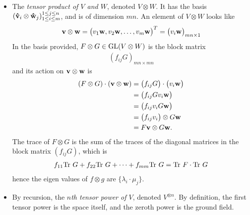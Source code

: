 \begin{itemize}
			\item The \emph{tensor product of $V$ and $W$}, denoted $V \otimes W$.
				\subitem It has the basis $(\mathbf{\hat{v}}_i \otimes \mathbf{\hat{w}}_j)_{1 \leq i \leq m}^{1 \leq j \leq n}$, and is of dimension $mn$.
				\subitem An element of $V \otimes W$ looks like \begin{align*}
					\mathbf{v} \otimes \mathbf{w} = \begin{pmatrix}
						v_1\mathbf{w}, v_2\mathbf{w}, \dots, v_m\mathbf{w}
					\end{pmatrix}^T = \begin{pmatrix}
						v_i\mathbf{w}
					\end{pmatrix}_{mn \times 1} 
				\end{align*}
				\subitem In the basis provided, $F \otimes G \in \text{GL}(V \otimes W)$ is the block matrix 
				\begin{align*}
					(f_{ij}G)_{mn \times mn}
				\end{align*}
				and its action on $\mathbf{v} \otimes \mathbf{w}$ is 
				\begin{align*}
					(F \otimes G ) \cdot (\mathbf{v}  \otimes \mathbf{w}) &= \begin{pmatrix}
						f_{ij}G
					\end{pmatrix}\cdot \begin{pmatrix}
						v_i\mathbf{w}
					\end{pmatrix} \\ 
					&= \begin{pmatrix}
						f_{ij}G v_i \mathbf{w}
					\end{pmatrix} \\ 
					&= \begin{pmatrix}
						f_{ij} v_i G\mathbf{w}
					\end{pmatrix} \\
					&=  \begin{pmatrix}
						f_{ij}v_i
					\end{pmatrix} \otimes G\mathbf{w} \\
					&= F\mathbf{v} \otimes G\mathbf{w}.
				\end{align*}
				\subitem The trace of $F \otimes G$ is the sum of the traces of the diagonal matrices in the block matrix $(f_{ij}G)$, which is 
				\begin{align*}
					f_{11} \text{Tr } G + f_{22} \text{Tr } G + \dots + f_{mm} \text{Tr } G = \text{Tr } F \cdot \text{Tr } G
				\end{align*}
				hence the eigen values of $f \otimes g$ are $\{\lambda_i \cdot \mu_j\}$.
				
			\item By recursion, the \emph{$n$th tensor power of $V$}, denoted $V^{\otimes n}$. By definition, the first tensor power is the space itself, and the zeroth power is the ground field.
			

\end{itemize}
